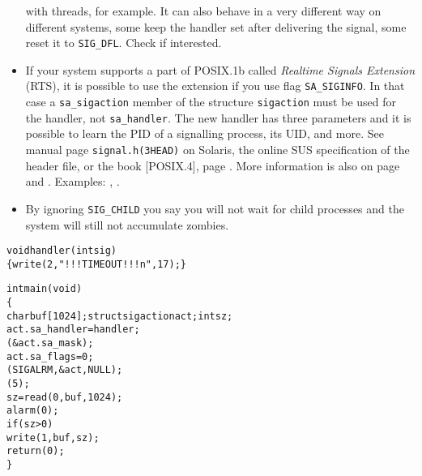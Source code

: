 \begin{itemize}
with threads, for example.  It can also behave in a very different way on
different systems, some keep the handler set after delivering the signal, some
reset it to \texttt{SIG\_DFL}.  Check  if
interested.
\item \label{REALTIMEEXTENSIONS} If your system supports a part of POSIX.1b
called \emph{Realtime Signals Extension} (RTS), it is possible to use the
extension if you use flag \texttt{SA\_SIGINFO}.  In that case a
\texttt{sa\_sigaction} member of the structure \texttt{sigaction} must be used
for the handler, not \texttt{sa\_handler}.  The new handler has three parameters
and it is possible to learn the PID of a signalling process, its UID, and more.
See manual page \texttt{signal.h(3HEAD)} on Solaris, the online SUS
specification of the header file, or the book [POSIX.4], page
\pageref{REF_PROGRAMMING}.  More information is also on page \pageref{POSIX} and
\pageref{SIGWAITINFO}.  Examples: ,
.
\item \label{IGNORE_SIG_CHLD} By ignoring \texttt{SIG\_CHILD} you say you will
not wait for child processes and the system will still not accumulate zombies.
\end{itemize}


\begin{slide}
\setlength{\baselineskip}{0.8\baselineskip}
\begin{alltt}
void handler(int sig)
\{ write(2," !!! TIMEOUT !!! \bs{}n", 17); \}

int main(void) 
\{
    char buf[1024]; struct sigaction act; int sz;
    act.sa\_handler = handler;
    (&act.sa\_mask);
    act.sa\_flags = 0;
    (SIGALRM, &act, NULL);
    (5);
    sz = read(0, buf, 1024);
    alarm(0);
    if (sz > 0)
        write(1, buf, sz);
    return (0);
\}
\end{alltt}
\end{slide}

\label{SIGALRM}

